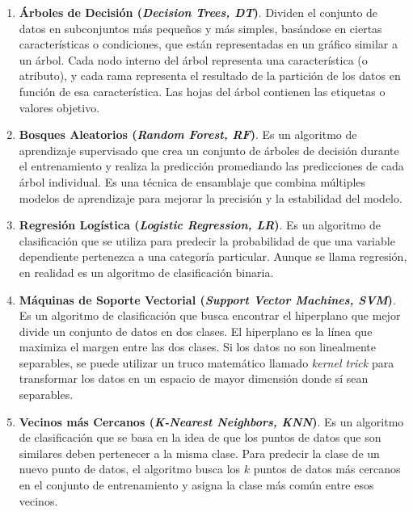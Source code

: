 \begin{enumerate}
    \item \textbf{Árboles de Decisión (\textit{Decision Trees, DT})}. Dividen el conjunto de datos
    en subconjuntos más pequeños y más simples, basándose en ciertas características o condiciones,
    que están representadas en un gráfico similar a un árbol. Cada nodo interno del árbol
    representa una característica (o atributo), y cada rama representa el resultado de la
    partición de los datos en función de esa característica. Las hojas del árbol contienen las
    etiquetas o valores objetivo.\\
    \item \textbf{Bosques Aleatorios (\textit{Random Forest, RF})}. Es un algoritmo de aprendizaje
    supervisado que crea un conjunto de árboles de decisión durante el entrenamiento y realiza
    la predicción promediando las predicciones de cada árbol individual. Es una técnica de
    ensamblaje que combina múltiples modelos de aprendizaje para mejorar la precisión y la
    estabilidad del modelo.\\
    \item \textbf{Regresión Logística (\textit{Logistic Regression, LR})}. Es un algoritmo de
    clasificación que se utiliza para predecir la probabilidad de que una variable dependiente
    pertenezca a una categoría particular. Aunque se llama regresión, en realidad es un algoritmo
    de clasificación binaria.\\
    \item \textbf{Máquinas de Soporte Vectorial (\textit{Support Vector Machines, SVM})}. Es un
    algoritmo de clasificación que busca encontrar el hiperplano que mejor divide un conjunto de
    datos en dos clases. El hiperplano es la línea que maximiza el margen entre las dos clases. Si
    los datos no son linealmente separables, se puede utilizar un truco matemático llamado
    \textit{kernel trick} para transformar los datos en un espacio de mayor dimensión donde sí
    sean separables.\\
    \item \textbf{Vecinos más Cercanos (\textit{K-Nearest Neighbors, KNN})}. Es un algoritmo de
    clasificación que se basa en la idea de que los puntos de datos que son similares deben
    pertenecer a la misma clase. Para predecir la clase de un nuevo punto de datos, el algoritmo
    busca los $k$ puntos de datos más cercanos en el conjunto de entrenamiento y asigna la clase
    más común entre esos vecinos.\\

\end{enumerate}
